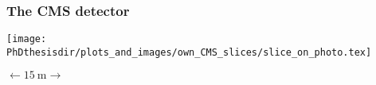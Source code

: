 \begin{frame}\addtocounter{framenumber}{-1}
\frametitle{The CMS detector}
\begin{center}
\vphantom{detects muons going through}

\vfill

\texttt{[image: \\PhDthesisdir/plots\_and\_images/own\_CMS\_slices/slice\_on\_photo.tex]}

\vfill

$\longleftarrow \SI{15}{\meter} \longrightarrow$
\end{center}
\end{frame}